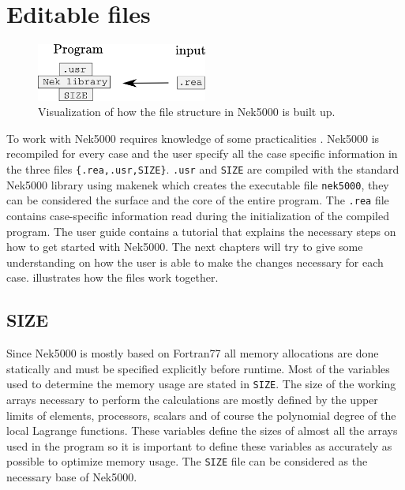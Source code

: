 \section{Editable files}
%
\begin{figure}[h]
	\centering
	\includegraphics[width=0.5\textwidth]{Figures/filestructure2.png}
	\caption{Visualization of how the file structure in Nek5000 is built up.}
	\label{fig:files}
\end{figure}
%
To work with Nek5000 requires knowledge of some practicalities .
Nek5000 is recompiled for every case and the user specify all the case specific 
information in the three files \verb|{.rea,.usr,SIZE}|. \verb|.usr| and \verb|SIZE| are 
compiled with the standard Nek5000 library using makenek which creates the executable file \verb|nek5000|,
they can be considered the surface and the core of the entire program. 
The \verb|.rea| file contains case-specific information read during the initialization of the 
compiled program. The user guide \cite{Nek} contains a tutorial that explains the necessary 
steps on how to get started with Nek5000. The next chapters will try to give some understanding on 
how the user is able to make the changes necessary for each case.  illustrates 
how the files work together. 
%
\subsection{SIZE}
Since Nek5000 is mostly based on Fortran77 all memory allocations are done statically and must be specified explicitly 
before runtime. Most of the variables used to determine the memory usage are stated in \verb|SIZE|.
The size of the working arrays necessary to perform the calculations are mostly defined by the upper limits of elements, 
processors, scalars and of course the polynomial degree
of the local Lagrange functions. These variables define the sizes of almost all 
the arrays used in the program so it is important to define these variables as accurately 
as possible to optimize memory usage. The \verb|SIZE| file can be considered as the necessary base 
of Nek5000.

